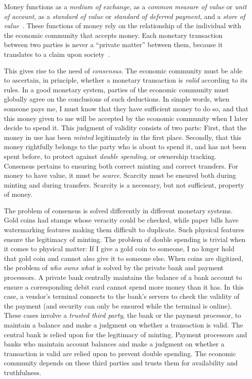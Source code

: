 Money functions as a \emph{medium of exchange}, as a \emph{common measure of
value} or \emph{unit of account}, as a \emph{standard of value} or
\emph{standard of deferred payment}, and a \emph{store of
value}~\cite{money-mechanism}. These functions of money rely on the relationship
of the individual with the economic community that accepts money. Each monetary
transaction between two parties is never a ``private matter'' between them,
because it translates to a claim upon society~\cite{philosophy-of-money}.

This gives rise to the need of \emph{consensus}. The economic community must be
able to ascertain, in principle, whether a monetary transaction is \emph{valid}
according to its rules. In a good monetary system, parties of the economic
community must globally agree on the conclusions of such deductions. In simple
words, when someone pays me, I must know that they have sufficient money to do
so, and that this money given to me will be accepted by the economic community
when I later decide to spend it. This judgment of validity consists of two
parts: First, that the money in use has been \emph{minted} legitimately in the first
place.
Secondly, that this money rightfully belongs to the party who is about to
spend it, and has not been spent before, to protect against \emph{double spending},
or {ownership tracking}.
Consensus pertains to ensuring both correct minting and correct transfers.
For money to have value, it must be \emph{scarce}. Scarcity must be ensured
both during minting and during transfers.
Scarcity is a necessary, but not sufficient,
property of money.

The problem of consensus is solved differently in different monetary systems. Gold
coins had stamps whose veracity could be checked, while paper bills have watermarking
features making them difficult to duplicate. Such physical features ensure the
legitimacy of minting. The problem of double spending is trivial when it comes to
physical matter: If I give a
gold coin to someone, I no longer hold that gold coin and cannot also give it to
someone else. When coins are digitized, the problem of \emph{who owns what}
is solved by the private bank and payment processors.
A private bank centrally maintains the balance of a bank account to ensure a
corresponding debit card cannot spend more money than it has. In this case, a
vendor's terminal connects to the bank's servers to check the validity of the
payment (and security can only be ensured while the terminal is online). These
cases involve a \emph{trusted third party}, the
bank or the payment processor, to maintain a balance and make a judgment on
whether a transaction is valid. The central bank is relied upon for the
legitimacy of minting. Payment processors and banks who maintain account
balances and make a judgment on whether a transaction is valid are relied upon
to prevent double spending. The economic community depends on these third
parties and trusts them for availability and truthfulness.


